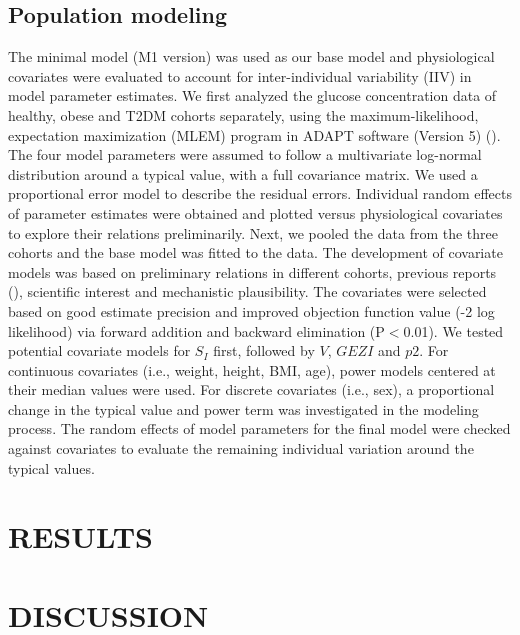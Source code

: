 \documentclass[utf8]{frontiersSCNS} %
\begin{document}
\subsection{Population modeling}
The minimal model (M1 version) was used as our base model and physiological covariates were evaluated to account for inter-individual variability (IIV) in model parameter estimates. We first analyzed the glucose concentration data of healthy, obese and T2DM cohorts separately, using the maximum-likelihood, expectation maximization (MLEM) program in ADAPT software (Version 5) (\cite{DArgenioDavidZ.SchumitzkyAlan2009}). The four model parameters were assumed to follow a multivariate log-normal distribution around a typical value, with a full covariance matrix. We used a proportional error model to describe the residual errors. Individual random effects of parameter estimates were obtained and plotted versus physiological covariates to explore their relations preliminarily. %
Next, we pooled the data from the three cohorts and the base model was fitted to the data. The development of covariate models was based on preliminary relations in different cohorts, previous reports (\cite{Denti2010}), %
scientific interest and mechanistic plausibility. The covariates were selected based on good estimate precision and improved objection function value (-2 log likelihood) via forward addition and backward elimination (P$<$0.01). We tested potential covariate models for $S_I$ first, followed by $V$, $GEZI$ and $p2$. For continuous covariates (i.e., weight, height, BMI, age), power models centered at their median values were used. For discrete covariates (i.e., sex), a proportional change in the typical value and power term was investigated in the modeling process. The random effects of model parameters for the final model were checked against covariates to evaluate the remaining individual variation around the typical values. 

\section{RESULTS}

\section{DISCUSSION}
\end{document}
